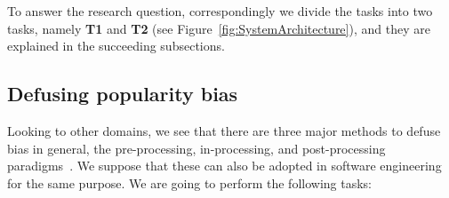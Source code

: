 To answer the research question, correspondingly we divide the tasks into two tasks, namely \textbf{T1} and \textbf{T2} (see Figure~\ref{fig:SystemArchitecture}), and they are explained in the succeeding subsections.




\subsection{Defusing popularity bias}

Looking to other domains, we see that there are three major methods to defuse bias in general, \ie the pre-processing, in-processing, and post-processing paradigms~\cite{doi:10.1089/big.2016.0048}. We suppose that these can also be adopted in software engineering for the same purpose. %
We are going to perform the following tasks:

